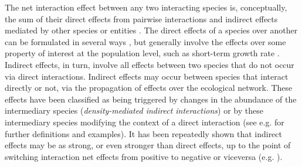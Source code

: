 The net interaction effect between any two interacting species is, conceptually, the sum of their direct effects from pairwise interactions and indirect effects mediated by other species or entities \citep{Abrams1987}. The direct effects of a species over another can be formulated in several ways \citep{Berlow2004}, but generally involve the effects over some property of interest at the population level, such as short-term growth rate \citep{Abrams1987}. Indirect effects, in turn, involve all effects between two species that do not occur via direct interactions. Indirect effects may occur between species that interact directly or not, via the propagation of effects over the ecological network. These effects have been classified as being triggered by changes in the abundance of the intermediary species (\textit{density-mediated indirect interactions}) or by these intermediary species modifying the context of a direct interaction (see e.g. \citealt{Wootton2002} for further definitions and examples). It has been repeatedly shown that indirect effects may be as strong, or even stronger than direct effects, up to the point of switching interaction net effects from positive to negative or viceversa (e.g. \citealt{Menge1995}).

